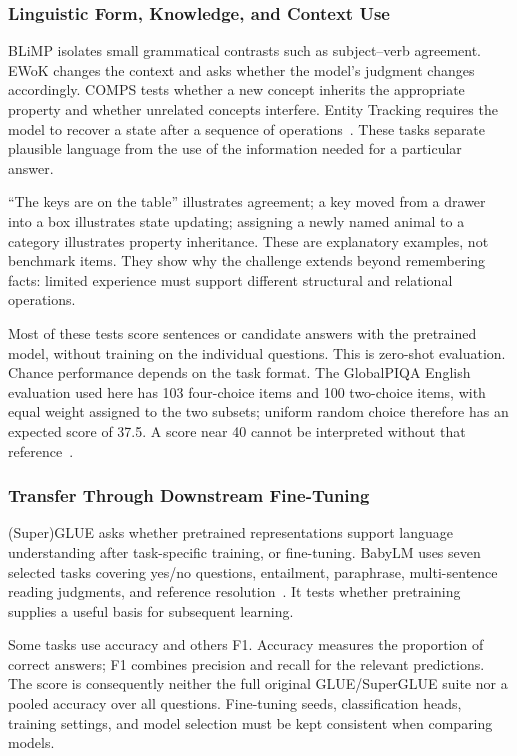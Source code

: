 \subsubsection{Linguistic Form, Knowledge, and Context Use}

BLiMP isolates small grammatical contrasts such as subject--verb agreement. EWoK changes the context and asks whether the model's judgment changes accordingly. COMPS tests whether a new concept inherits the appropriate property and whether unrelated concepts interfere. Entity Tracking requires the model to recover a state after a sequence of operations~\citep{warstadt2020blimp,ivanova2025ewok,misra2023comps,kim2023entity}. These tasks separate plausible language from the use of the information needed for a particular answer.

``The keys are on the table'' illustrates agreement; a key moved from a drawer into a box illustrates state updating; assigning a newly named animal to a category illustrates property inheritance. These are explanatory examples, not benchmark items. They show why the challenge extends beyond remembering facts: limited experience must support different structural and relational operations.

Most of these tests score sentences or candidate answers with the pretrained model, without training on the individual questions. This is zero-shot evaluation. Chance performance depends on the task format. The GlobalPIQA English evaluation used here has 103 four-choice items and 100 two-choice items, with equal weight assigned to the two subsets; uniform random choice therefore has an expected score of 37.5. A score near 40 cannot be interpreted without that reference~\citep{chang2026globalpiqa,babylm2026evaluation}.

\subsubsection{Transfer Through Downstream Fine-Tuning}

(Super)GLUE asks whether pretrained representations support language understanding after task-specific training, or fine-tuning. BabyLM uses seven selected tasks covering yes/no questions, entailment, paraphrase, multi-sentence reading judgments, and reference resolution~\citep{wang2018glue,wang2019superglue}. It tests whether pretraining supplies a useful basis for subsequent learning.

Some tasks use accuracy and others F1. Accuracy measures the proportion of correct answers; F1 combines precision and recall for the relevant predictions. The score is consequently neither the full original GLUE/SuperGLUE suite nor a pooled accuracy over all questions. Fine-tuning seeds, classification heads, training settings, and model selection must be kept consistent when comparing models.

